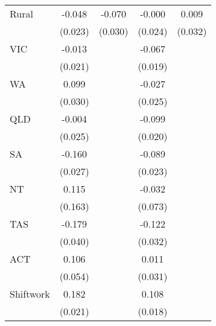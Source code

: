 {\begin{tabular}{l*{4}{c}}
Rural               &      -0.048\sym{**} &      -0.070\sym{**} &      -0.000         &       0.009         \\
                    &     (0.023)         &     (0.030)         &     (0.024)         &     (0.032)         \\
VIC                 &      -0.013         &                     &      -0.067\sym{***}&                     \\
                    &     (0.021)         &                     &     (0.019)         &                     \\
WA                  &       0.099\sym{***}&                     &      -0.027         &                     \\
                    &     (0.030)         &                     &     (0.025)         &                     \\
QLD                 &      -0.004         &                     &      -0.099\sym{***}&                     \\
                    &     (0.025)         &                     &     (0.020)         &                     \\
SA                  &      -0.160\sym{***}&                     &      -0.089\sym{***}&                     \\
                    &     (0.027)         &                     &     (0.023)         &                     \\
NT                  &       0.115         &                     &      -0.032         &                     \\
                    &     (0.163)         &                     &     (0.073)         &                     \\
TAS                 &      -0.179\sym{***}&                     &      -0.122\sym{***}&                     \\
                    &     (0.040)         &                     &     (0.032)         &                     \\
ACT                 &       0.106\sym{*}  &                     &       0.011         &                     \\
                    &     (0.054)         &                     &     (0.031)         &                     \\
Shiftwork           &       0.182\sym{***}&                     &       0.108\sym{***}&                     \\
                    &     (0.021)         &                     &     (0.018)         &                     \\

\end{tabular}}

